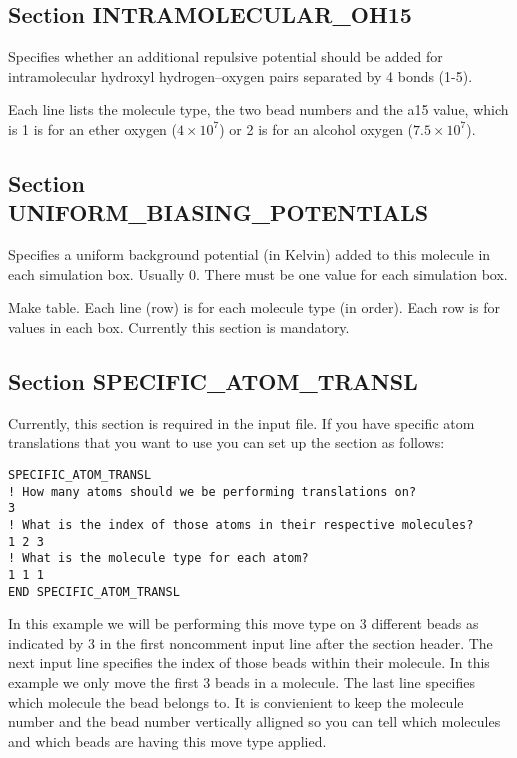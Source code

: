 \documentclass[12pt,letterpaper]{article}
\begin{document}
\subsection{Section \textbf{INTRAMOLECULAR\_OH15}}
Specifies whether an additional repulsive potential should
be added for intramolecular hydroxyl hydrogen--oxygen pairs
separated by 4 bonds (1-5).

Each line lists the molecule type, the two bead numbers and
the a15 value, which is 1 is for an ether oxygen ($4\times
10^7$) or 2 is for an alcohol oxygen ($7.5\times 10^7$).

\subsection{Section \textbf{UNIFORM\_BIASING\_POTENTIALS}}
\label{uniform-biasing-potentials}
Specifies a uniform background potential
(in Kelvin) added to this molecule in each simulation box.
Usually 0. There must be one value for each simulation box.

Make table. Each line (row) is for each molecule type (in order).
Each row is for values in each box. Currently this section
is mandatory.

\subsection{Section \textbf{SPECIFIC\_ATOM\_TRANSL}}
Currently, this section is required in the input file.
If you have specific atom translations that you want to use you can set up the
section as follows:
\begin{verbatim}
SPECIFIC_ATOM_TRANSL
! How many atoms should we be performing translations on?
3
! What is the index of those atoms in their respective molecules?
1 2 3
! What is the molecule type for each atom?
1 1 1
END SPECIFIC_ATOM_TRANSL
\end{verbatim}

In this example we will be performing this move type on 3 different beads as indicated by 3 in
the first noncomment input line after the section header. The next input line specifies the index
of those beads within their molecule. In this example we only move the first 3 beads in a molecule.
The last line specifies which molecule the bead belongs to. It is convienient to keep the molecule
number and the bead number vertically alligned so you can tell which molecules and which beads are
having this move type applied.

\end{document}
